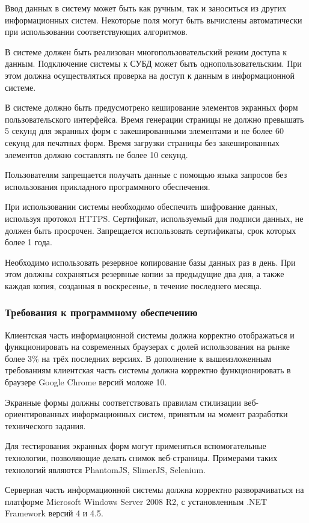 Ввод данных в систему может быть как ручным, так и заноситься из других информационных систем.
Некоторые поля могут быть вычислены автоматически при использовании соответствующих алгоритмов.

В системе должен быть реализован многопользовательский режим доступа к данным.
Подключение системы к СУБД может быть однопользовательским.
При этом должна осуществляться проверка на доступ к данным в информационной системе.

В системе должно быть предусмотрено кеширование элементов экранных форм пользовательского интерфейса.
Время генерации страницы не должно превышать 5 секунд для экранных форм с закешированными элементами и не более 60 секунд для печатных форм.
Время загрузки страницы без закешированных элементов должно составлять не более 10 секунд.

Пользователям запрещается получать данные с помощью языка запросов без использования прикладного программного обеспечения.

При использовании системы необходимо обеспечить шифрование данных, используя протокол HTTPS.
Сертификат, используемый для подписи данных, не должен быть просрочен.
Запрещается использовать сертификаты, срок которых более 1 года.

Необходимо использовать резервное копирование базы данных раз в день.
При этом должны сохраняться резервные копии за предыдущие два дня, а также каждая копия, созданная в воскресенье, в течение последнего месяца.

\subsubsection{Требования к программному обеспечению}

Клиентская часть информационной системы должна корректно отображаться и функционировать на современных браузерах с долей использования на рынке более 3\% на трёх последних версиях.
В дополнение к вышеизложенным требованиям клиентская часть системы должна корректно функционировать в браузере Google Chrome версий моложе 10.

Экранные формы должны соответствовать правилам стилизации веб-ориентированных информационных систем, принятым на момент разработки технического задания.

Для тестирования экранных форм могут применяться вспомогательные технологии, позволяющие делать снимок веб-страницы.
Примерами таких технологий являются PhantomJS, SlimerJS, Selenium.

Серверная часть информационной системы должна корректно разворачиваться на платформе Microsoft Windows Server 2008 R2,  с установленным .NET Framework версий 4 и 4.5.

